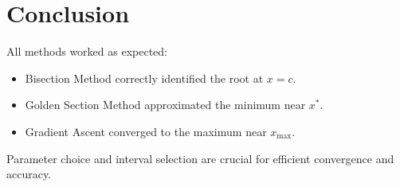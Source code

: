 \documentclass{article}
\begin{document}
\section{Conclusion}

All methods worked as expected:
\begin{itemize}
    \item Bisection Method correctly identified the root at \( x = c \).
    \item Golden Section Method approximated the minimum near \( x^* \).
    \item Gradient Ascent converged to the maximum near \( x_{\text{max}} \).
\end{itemize}

Parameter choice and interval selection are crucial for efficient convergence and accuracy.
\end{document}
